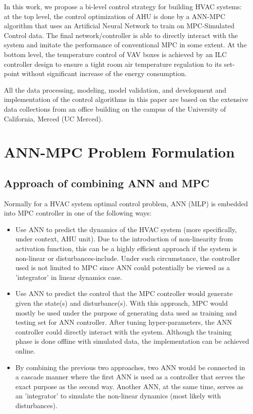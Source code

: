 \documentclass[conference]{IEEEtran}
\begin{document}
In this work, we propose a bi-level control strategy for building HVAC systems: at the top level, the control optimization of AHU is done by a ANN-MPC algorithm that uses an Artificial Neural Network to train on MPC-Simulated Control data. The final network/controller is able to directly interact with the system and imitate the performance of conventional MPC in some extent. At the bottom level, the temperature control of VAV boxes is achieved by an ILC controller design to ensure a tight room air temperature regulation to its set-point without significant increase of the energy consumption.

All the data processing, modeling, model validation, and development and implementation of the control algorithms in this paper are based on the extensive data collections from an office building on the campus of the University of California, Merced (UC Merced).






\section{ANN-MPC Problem Formulation}
\subsection{Approach of combining ANN and MPC}
Normally for a HVAC system optimal control problem, ANN (MLP) is embedded into MPC controller in one of the following ways:
\begin{itemize}
\item Use ANN to predict the dynamics of the HVAC system (more specifically, under context, AHU unit). Due to the introduction of non-linearity from activation function, this can be a highly efficient approach if the system is non-linear or disturbances-include. Under such circumstance, the controller used is not limited to MPC since ANN could potentially be viewed as a 'integrator' in linear dynamics case.
\item Use ANN to predict the control that the MPC controller would generate given the state(s) and disturbance(s). With this approach, MPC would mostly be used under the purpose of generating data used as training and testing set for ANN controller. After tuning hyper-parameters, the ANN controller could directly interact with the system. Although the training phase is done offline with simulated data, the implementation can be achieved online.
\item By combining the previous two approaches, two ANN would be connected in a cascade manner where the first ANN is used as a controller that serves the exact purpose as the second way. Another ANN, at the same time, serves as an 'integrator' to simulate the non-linear dynamics (most likely with disturbances).
\end{itemize}
\end{document}
